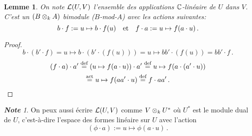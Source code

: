 \documentclass[francais,a4paper,11pt,reqno]{amsart}
\theoremstyle{plain}
\newtheorem{LEMME}[THEO]{\bf Lemme}
\theoremstyle{definition}
\theoremstyle{remark}
\newtheorem{NOTE}[THEO]{\bf Note}
\newcommand{\act}{\cdot}
\newcommand\eqcom[1]{\mathrel{\overset{\text{#1}}{=}}}
\begin{document}
\begin{LEMME}
  On note $\operatorname{\mathcal L}(U, V)$ l'ensemble des applications ${\mathbb C}$-linéaire de $U$ dans
  $V$. C'est un $(B\otimes_k A)$ bimodule ($B$-mod-$A$) avec les actions
  suivantes:
  \begin{equation}
    b\act f := u\mapsto b\act f(u)
    \qandq
    f\act a := u\mapsto f(a\act u)\,.
  \end{equation}
\end{LEMME}
\begin{proof}
  \begin{equation}
    b\act (b'\act f) = u\mapsto b \act (b'\act(f(u)))
    = u\mapsto b b'\act(f(u)) = bb'\act f\,.
  \end{equation}
  \begin{multline}
    (f\act a) \act a'
    \eqcom{def}(u\mapsto f(a\act u)) \act a'
    \eqcom{def}u\mapsto f(a\act (a' \act u))\\
    \eqcom{act}u\mapsto f(aa'\act u)
    \eqcom{def}f\act aa'\,.\qedhere
  \end{multline}
\end{proof}
\begin{NOTE}
  On peux aussi écrire $\operatorname{\mathcal L}(U, V)$ comme $V\otimes_k U^*$ où $U^*$ est le
  module dual de $U$, c'est-à-dire l'espace des formes linéaire sur $U$ avec
  l'action
  \begin{equation}
  (\phi\act a) := u\mapsto \phi(a\act u)\,.
\end{equation}
\end{NOTE}
\end{document}
